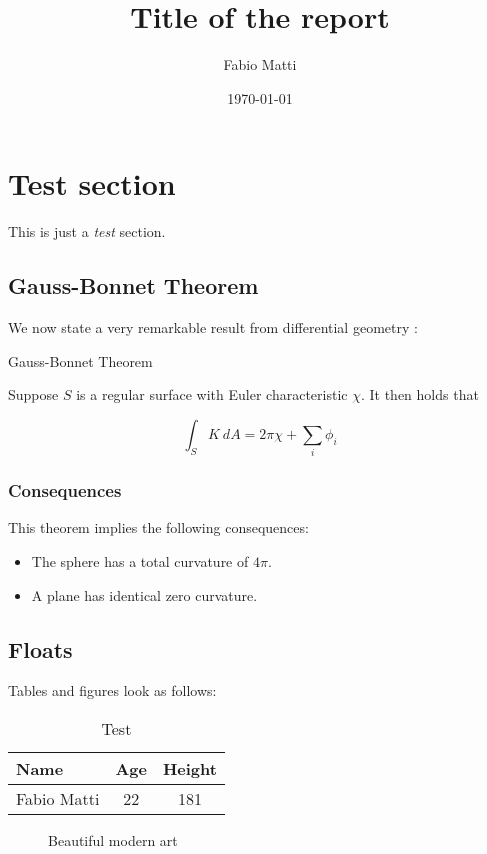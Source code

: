 \documentclass[11pt, a4paper]{article}
\title{Title of the report}
\author{Fabio Matti}
\date{\today}
\begin{document}
\maketitle

\section{Test section}
\label{sec:label}

This is just a \emph{test} section.

\subsection{Gauss-Bonnet Theorem}
\label{subsec:gauss-bonnet}

We now state a very remarkable result from differential
geometry \citep{article2021}:

\begin{block}{Gauss-Bonnet Theorem}

    Suppose $S$ is a regular surface with Euler characteristic $\chi$.
    It then holds that

    \begin{equation}
        \int_S K~dA = 2\pi\chi + \sum_i \phi_i
        \label{equ:gauss-bonnet}
    \end{equation}

\end{block}

\subsubsection{Consequences}
\label{subsubsec:gauss-bonnet}

This theorem implies the following consequences:

\begin{itemize}
    \item The sphere has a total curvature of $4\pi$.
    \item A plane has identical zero curvature.
\end{itemize}

\subsection{Floats}
\label{subsec:floats}

Tables and figures look as follows:

\begin{table}[h]
    \caption{Test}
    \label{tab:test}
    \centering
    \renewcommand{\arraystretch}{1.2}
    \begin{tabular}{@{}lcc@{}}
        \toprule
        Name & Age & Height \\
        \midrule
        Fabio Matti & 22 & 181 \\
        \bottomrule
    \end{tabular}
\end{table}

\begin{figure}[h]
    \centering
    \caption{Beautiful modern art}
    \label{fig:theme}
\end{figure}


\end{document}
